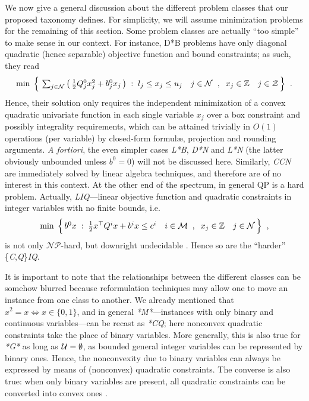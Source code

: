 We now give a general discussion about the different problem classes that our proposed taxonomy defines.
For simplicity, we will assume minimization problems for the remaining of this section.
Some problem classes are actually ``too simple'' to make sense in our context. For instance, D*B problems have only diagonal quadratic (hence separable) objective function and bound constraints; as such, they read
\[
 \textstyle
 \min \; \Big\{ \,
 \sum_{j \in \mathcal{N}} \big( \, {\textstyle \frac{1}{2}} Q^0_j x_j^2 + b^0_j x_j \, \big) \;:\;
 l_j \leq x_j \leq u_j \quad j \in \mathcal{N} \;\;,\;\;
 x_j \in \mathbb{Z} \quad j \in \mathcal{Z} \, \Big\}
 \;\; .
\]
Hence, their solution only requires the independent minimization of a convex quadratic univariate function in each single variable $x_j$ over a box constraint and possibly integrality requirements, which can be attained trivially in $O(1)$ operations (per variable) by closed-form formul{\ae}, projection and rounding arguments. \emph{A fortiori}, the even simpler cases \textit{L*B}, \textit{D*N} and \textit{L*N} (the latter obviously unbounded unless $b^0 = 0$) will not be discussed here. Similarly, \textit{CCN} are immediately solved by linear algebra techniques, and therefore are of no interest in this context. At the other end of the spectrum, in general QP is a hard problem. Actually, \textit{LIQ}---linear objective function and quadratic constraints in integer variables with no finite bounds, i.e.
\[
 \textstyle
 \min \; \Big\{ \, b^0 x \;:\;
 {\textstyle \frac{1}{2}} x^\top Q^i x + b^i x \leq c^i \quad i \in \mathcal{M} \;\;,\;\;
 x_j \in \mathbb{Z} \quad j \in \mathcal{N} \, \Big\}
 \;\; ,
\]
is not only $\mathcal{NP}$-hard, but downright undecidable \cite{jeroslow}. Hence so are the ``harder'' \{\textit{C},\textit{Q}\}\textit{IQ}.

\smallskip
It is important to note that the relationships between the different classes can be somehow blurred because reformulation techniques may allow one to move an instance from one class to another. We already mentioned that $x^2 = x \iff x \in \{0, 1\}$, and in general \textit{*M*}---instances with only binary and continuous variables---can be recast as \textit{*CQ}; here nonconvex quadratic constraints take the place of binary variables. More generally, this is also true for \textit{*G*} as long as $\mathcal{U} = \emptyset$, as bounded general integer variables can be represented by binary ones.
Hence, the nonconvexity due to binary variables can always be expressed by means of (nonconvex) quadratic constraints. The converse is also true: when only binary variables are present, all quadratic constraints can be converted into convex ones \cite{BEP09,BEL13}.



